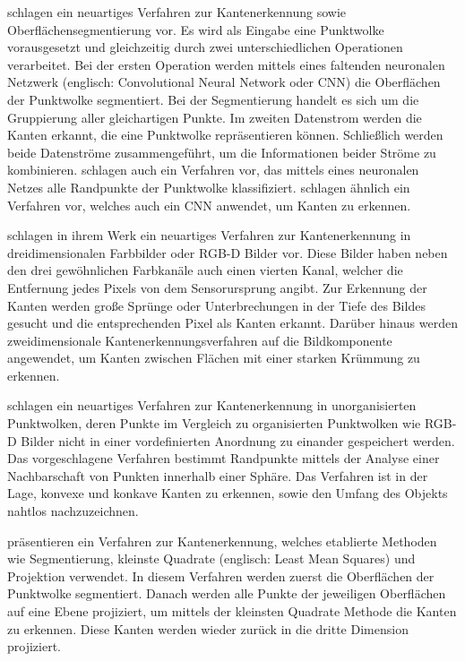 \Textcite{hu_jsenet_2020} schlagen ein neuartiges Verfahren zur Kantenerkennung sowie Oberflächensegmentierung vor. Es wird als Eingabe eine Punktwolke vorausgesetzt und gleichzeitig durch zwei unterschiedlichen Operationen verarbeitet. Bei der ersten Operation werden mittels eines faltenden neuronalen Netzwerk (englisch: Convolutional Neural Network oder CNN) die Oberflächen der Punktwolke segmentiert. Bei der Segmentierung handelt es sich um die Gruppierung aller gleichartigen Punkte. Im zweiten Datenstrom werden die Kanten erkannt, die eine Punktwolke repräsentieren können. Schließlich werden beide Datenströme zusammengeführt, um die Informationen beider Ströme zu kombinieren. \Textcite{bazazian_edc-net_2021} schlagen auch ein Verfahren vor, das mittels eines neuronalen Netzes alle Randpunkte der Punktwolke klassifiziert. \Textcite{himeur_pcednet_2021} schlagen ähnlich ein Verfahren vor, welches auch ein CNN anwendet, um Kanten zu erkennen. 

\Textcite{choi_rgb-d_2013} schlagen in ihrem Werk ein neuartiges Verfahren zur Kantenerkennung in dreidimensionalen Farbbilder oder RGB-D Bilder vor. Diese Bilder haben neben den drei gewöhnlichen Farbkanäle auch einen vierten Kanal, welcher die Entfernung jedes Pixels von dem Sensorursprung angibt. Zur Erkennung der Kanten werden große Sprünge oder Unterbrechungen in der Tiefe des Bildes gesucht und die entsprechenden Pixel als Kanten erkannt. Darüber hinaus werden zweidimensionale Kantenerkennungsverfahren auf die Bildkomponente angewendet, um Kanten zwischen Flächen mit einer starken Krümmung zu erkennen. 

\Textcite{mineo_novel_2019} schlagen ein neuartiges Verfahren zur Kantenerkennung in unorganisierten Punktwolken, deren Punkte im Vergleich zu organisierten Punktwolken wie RGB-D Bilder nicht in einer vordefinierten Anordnung zu einander gespeichert werden. Das vorgeschlagene Verfahren bestimmt Randpunkte mittels der Analyse einer Nachbarschaft von Punkten innerhalb einer Sphäre. Das Verfahren ist in der Lage, konvexe und konkave Kanten zu erkennen, sowie den Umfang des Objekts nahtlos nachzuzeichnen.

\Textcite{lu_fast_2019} präsentieren ein Verfahren zur Kantenerkennung, welches etablierte Methoden wie Segmentierung, kleinste Quadrate (englisch: Least Mean Squares) und Projektion verwendet. In diesem Verfahren werden zuerst die Oberflächen der Punktwolke segmentiert. Danach werden alle Punkte der jeweiligen Oberflächen auf eine Ebene projiziert, um mittels der kleinsten Quadrate Methode die Kanten zu erkennen. Diese Kanten werden wieder zurück in die dritte Dimension projiziert.

